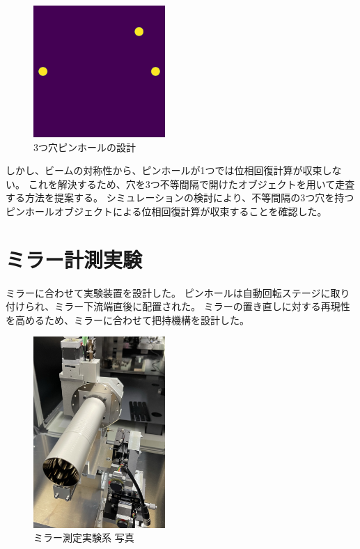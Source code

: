 \documentclass[a4j]{jarticle}
\begin{document}
\begin{figure}[!ht]
\centering
\includegraphics[width=5cm]{../thesis/chap3/figure/three_pinhole_mask.png}
\caption{3つ穴ピンホールの設計}
\label{fig:transverse_schematic}
\end{figure}

しかし、ビームの対称性から、ピンホールが1つでは位相回復計算が収束しない。
これを解決するため、穴を3つ不等間隔で開けたオブジェクトを用いて走査する方法を提案する。
シミュレーションの検討により、不等間隔の3つ穴を持つピンホールオブジェクトによる位相回復計算が収束することを確認した。

\section{ミラー計測実験}

ミラーに合わせて実験装置を設計した。
ピンホールは自動回転ステージに取り付けられ、ミラー下流端直後に配置された。
ミラーの置き直しに対する再現性を高めるため、ミラーに合わせて把持機構を設計した。

\begin{figure}[!ht]
\centering
\includegraphics[width=5cm]{../thesis/chap5/figure/photo_mirror_pinhole.png}
\caption{ミラー測定実験系 写真}
\label{fig:photo_mirror_experiment_mirror_and_pinhole}
\end{figure}
\end{document}
